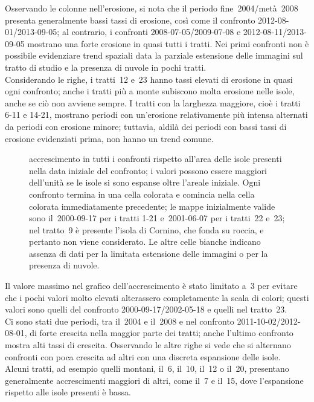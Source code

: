 Osservando le colonne nell'erosione, si nota che il periodo fine~2004/metà~2008 presenta generalmente bassi tassi di erosione, così come il confronto 2012-08-01/2013-09-05;
al contrario, i confronti 2008-07-05/2009-07-08 e 2012-08-11/2013-09-05 mostrano una forte erosione in quasi tutti i tratti.
Nei primi confronti non è possibile evidenziare trend spaziali data la parziale estensione delle immagini sul tratto di studio e la presenza di nuvole in pochi tratti.
\\
Considerando le righe, i tratti~12 e~23 hanno tassi elevati di erosione in quasi ogni confronto; anche i tratti più a monte subiscono molta erosione nelle isole, anche se ciò non avviene sempre.
I tratti con la larghezza maggiore, cioè i tratti 6-11 e 14-21, mostrano periodi con un'erosione relativamente più intensa alternati da periodi con erosione minore; tuttavia, aldilà dei periodi con bassi tassi di erosione evidenziati prima, non hanno un trend comune.
%
\begin{figure}
	\centering
	
	\caption[accrescimento in tutti i confronti rispetto all'area delle isole presenti inizialmente]{accrescimento in tutti i confronti rispetto all'area delle isole presenti nella data iniziale del confronto; i valori possono essere maggiori dell'unità se le isole si sono espanse oltre l'areale iniziale.
	Ogni confronto termina in una cella colorata e comincia nella cella colorata immediatamente precedente; le mappe inizialmente valide sono il~2000-09-17 per i tratti 1-21 e~2001-06-07 per i tratti~22 e~23; nel tratto~9 è presente l'isola di Cornino, che fonda su roccia, e pertanto non viene considerato.
	Le altre celle bianche indicano assenza di dati per la limitata estensione delle immagini o per la presenza di nuvole.}
	\label{graph:accrescimento-matrix}
\end{figure}
%

Il valore massimo nel grafico dell'accrescimento è stato limitato a~\num{3} per evitare che i pochi valori molto elevati alterassero completamente la scala di colori; questi valori sono quelli del confronto 2000-09-17/2002-05-18 e quelli nel tratto~23.
\\
Ci sono stati due periodi, tra il~2004 e il~2008 e nel confronto 2011-10-02/2012-08-01, di forte crescita nella maggior parte dei tratti; anche l'ultimo confronto mostra alti tassi di crescita.
Osservando le altre righe si vede che si alternano confronti con poca crescita ad altri con una discreta espansione delle isole.
\\
Alcuni tratti, ad esempio quelli montani, il~6, il~10, il~12 o il~20, presentano generalmente accrescimenti maggiori di altri, come il~7 e il~15, dove l'espansione rispetto alle isole presenti è bassa.

